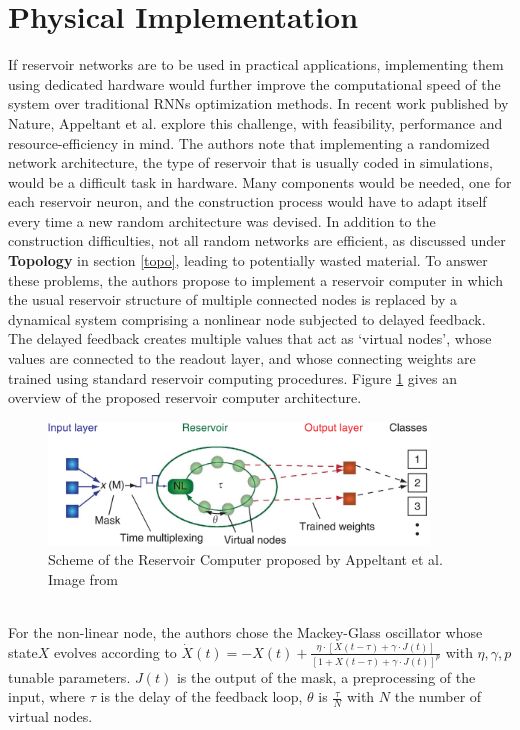 \documentclass[12pt,oneside]{CUNY_CS_PhD}
\begin{document}
\section{Physical Implementation}
If reservoir networks are to be used in practical applications, implementing them using dedicated hardware would further improve the computational speed of the system over traditional RNNs optimization methods. In recent work published by Nature, Appeltant et al. \cite{appeltant2011information, appeltant2014constructing} 
explore this challenge, with feasibility, performance and resource-efficiency in mind. The authors note that implementing a randomized network architecture, the type of reservoir that is usually coded in simulations, would be a difficult task in hardware. Many components would be needed, one for each reservoir neuron, and the construction process would have to adapt itself every time a new random architecture was devised. In addition to the construction difficulties, not all random networks are efficient, as discussed under \textbf{Topology} in section \ref{topo}, leading to potentially wasted material. To answer these problems, the authors propose to implement a reservoir computer in which the usual reservoir structure of multiple connected nodes is replaced by a dynamical system comprising a nonlinear node subjected to delayed feedback. The delayed feedback creates multiple values that act as `virtual nodes', whose values are connected to the readout layer, and whose connecting weights are trained using standard reservoir computing procedures. Figure \ref{fig:delayed_fb} gives an overview of the proposed reservoir computer architecture.
\begin{figure}[!htbp]
\centering
\includegraphics[width=0.9\textwidth]{pictures/delayed-feedback-res.png}
\caption{Scheme of the Reservoir Computer proposed by Appeltant et al. Image from \cite{appeltant2011information}}
\label{fig:delayed_fb}
\end{figure}\\
For the non-linear node, the authors chose the Mackey-Glass oscillator whose state$X$ evolves according to $\dot X (t) = -X(t) + \frac{\eta \cdot [X(t-\tau) + \gamma \cdot J(t)]}{[1+X(t-\tau) + \gamma \cdot J(t)]^p }$ with $\eta, \gamma, p$ tunable parameters. $J(t)$ is the output of the mask, a preprocessing of the input, where $\tau$ is the delay of the feedback loop, $\theta$ is $\frac{\tau}{N}$ with $N$ the number of virtual nodes. 
\end{document}

